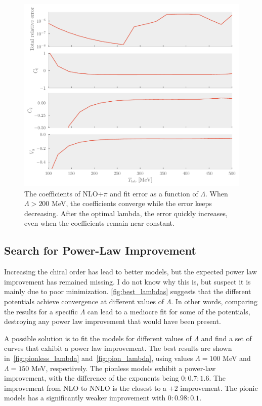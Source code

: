 \begin{figure}[]
  \centering
  \includegraphics{Figures/lambdas_NLO_coeff.pdf}
  \caption{\label{fig:lambda_NLO} The coefficients of NLO\(+\pi\) and fit error
    as a function of \(\Lambda\). When \(\Lambda > 200\) MeV, the coefficients
    converge while the error keeps decreasing. After the optimal lambda, the
    error quickly increases, even when the coefficients remain near constant.}
\end{figure}

\FloatBarrier{}


\subsection{Search for Power-Law Improvement}

Increasing the chiral order has lead to better models, but the expected power
law improvement has remained missing. I do not know why this is, but suspect it
is mainly due to poor minimization. \cref{fig:best_lambdas} suggests that the
different potentials achieve convergence at different values of \(\Lambda\). In
other words, comparing the results for a specific \(\Lambda\) can lead to a
mediocre  fit for some of the potentials, destroying any power law improvement
that would have been present.

A possible solution is to fit the models for different values of \(\Lambda\) and
find a set of curves that exhibit a power law improvement. The best results are
shown in~\cref{fig:pionless_lambda} and~\cref{fig:pion_lambda}, using values
\(\Lambda=100\) MeV and \(\Lambda=150\) MeV, respectively. The pionless models
exhibit a power-law improvement, with the difference of the exponents being
\(0:0.7:1.6\). The
improvement from NLO to NNLO is the closest to a \(+2\) improvement. The pionic
models has a significantly weaker improvement with \(0:0.98:0.1\). 


